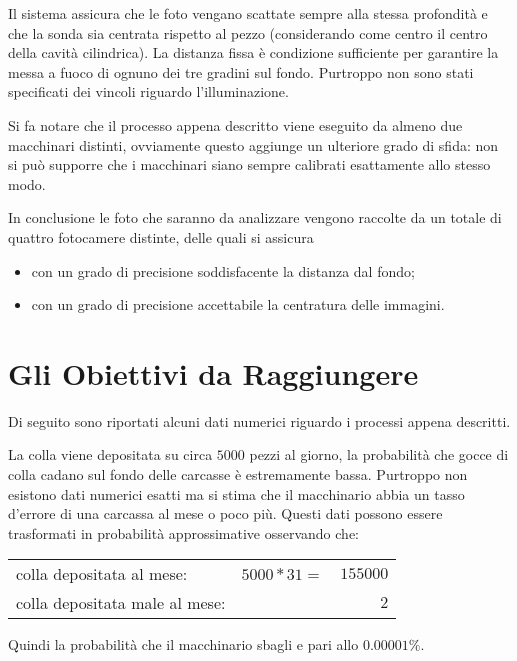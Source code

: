 Il sistema assicura che le foto vengano scattate sempre alla stessa profondità e che la sonda sia centrata rispetto al pezzo (considerando come centro il centro della cavità cilindrica).
La distanza fissa è condizione sufficiente per garantire la messa a fuoco di ognuno dei tre gradini sul fondo.
Purtroppo non sono stati specificati dei vincoli riguardo l'illuminazione.

Si fa notare che il processo appena descritto viene eseguito da almeno due macchinari distinti, ovviamente questo aggiunge un ulteriore grado di sfida: non si può supporre che i macchinari siano sempre calibrati esattamente allo stesso modo.

In conclusione le foto che saranno da analizzare vengono raccolte da un totale di quattro fotocamere distinte, delle quali si assicura
\begin{itemize}
  \item con un grado di precisione soddisfacente la distanza dal fondo;
  \item con un grado di precisione accettabile la centratura delle immagini.
\end{itemize}


\section{Gli Obiettivi da Raggiungere}
Di seguito sono riportati alcuni dati numerici riguardo i processi appena descritti.

La colla viene depositata su circa $5000$ pezzi al giorno, la probabilità che gocce di colla cadano sul fondo delle carcasse è estremamente bassa.
Purtroppo non esistono dati numerici esatti ma si stima che il macchinario abbia un tasso d'errore di una carcassa al mese o poco più.
Questi dati possono essere trasformati in probabilità approssimative osservando che:

\begin{center}
  \begin{tabular}{ l c r }
    colla depositata al mese: & $5000 * 31 =$& $155000$ \\
    colla depositata male al mese: && $2$
  \end{tabular}
\end{center}
Quindi la probabilità che il macchinario sbagli e pari allo $0.00001\%$.

